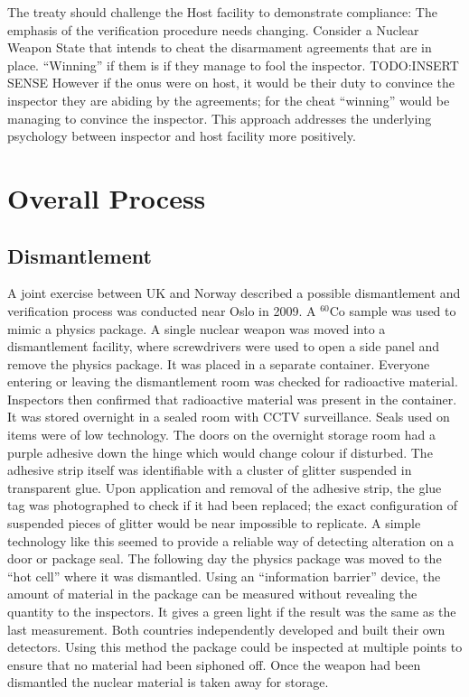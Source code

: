 \documentclass[twoside,titlepage,11pt,twocolumn,a4paper]{article}
\begin{document}
The treaty should challenge the Host facility to demonstrate
compliance: The emphasis of the verification procedure needs
changing. Consider a Nuclear Weapon State that intends to cheat the
disarmament agreements that are in place. ``Winning'' if them is if
they manage to fool the inspector. TODO:INSERT SENSE However if the
onus were on host, it would be their duty to convince the inspector
they are abiding by the agreements; for the cheat ``winning'' would be
managing to convince the inspector. This approach addresses the
underlying psychology between inspector and host facility more
positively.

\section{Overall Process}
\subsection{Dismantlement}
A joint exercise between UK and Norway described a possible
dismantlement and verification process was conducted near Oslo in
2009. A \( \mathrm{^{60}Co} \) sample was used to mimic a physics
package. A single nuclear weapon was moved into a dismantlement
facility, where screwdrivers were used to open a side panel and remove
the physics package. It was placed in a separate container. Everyone
entering or leaving the dismantlement room was checked for radioactive
material. Inspectors then confirmed that radioactive material was
present in the container. It was stored overnight in a sealed room
with CCTV surveillance. Seals used on items were of low
technology. The doors on the overnight storage room had a purple
adhesive down the hinge which would change colour if disturbed. The
adhesive strip itself was identifiable with a cluster of glitter
suspended in transparent glue. Upon application and removal of the
adhesive strip, the glue tag was photographed to check if it had been
replaced; the exact configuration of suspended pieces of glitter would
be near impossible to replicate. A simple technology like this seemed
to provide a reliable way of detecting alteration on a door or package
seal. The following day the physics package was moved to the ``hot
cell'' where it was dismantled. Using an ``information barrier''
device, the amount of material in the package can be measured without
revealing the quantity to the inspectors. It gives a green light if
the result was the same as the last measurement. Both countries
independently developed and built their own detectors. Using this
method the package could be inspected at multiple points to ensure
that no material had been siphoned off. Once the weapon had been
dismantled the nuclear material is taken away for
storage. \citep{dismantleBBC2009}
\end{document}
